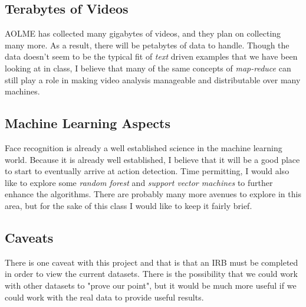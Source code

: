 \documentclass[paper=a4, fontsize=11pt]{scrartcl} %
\numberwithin{equation}{section} %
\numberwithin{figure}{section} %
\numberwithin{table}{section} %
\begin{document}
\subsection{Terabytes of Videos} 
AOLME has collected many gigabytes of videos, and they plan on collecting many more. As a result, there will be petabytes
of data to handle. Though the data doesn't seem to be the typical fit of \textit{text} driven examples that we have been
looking at in class, I believe that many of the same concepts of \textit{map-reduce} can still play a role in making video
analysis manageable and distributable over many machines. 

\subsection{Machine Learning Aspects}
Face recognition is already a well established science in the machine learning world. Because it is already well established, 
I believe that it will be a good place to start to eventually arrive at action detection. Time permitting, I would also like to 
explore some \textit{random forest} and \textit{support vector machines} to further enhance the algorithms. There are
probably many more avenues to explore in this area, but for the sake of this class I would like to keep it fairly brief. 

\subsection{Caveats}
There is one caveat with this project and that is that an IRB must be completed in order to view the current datasets.  
There is the possibility that we could work with other datasets  to "prove our point", but it would be much more useful 
if we could work with the real data to provide useful results. 
\end{document}
